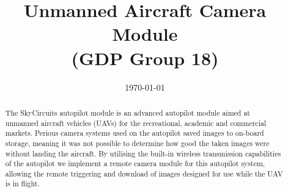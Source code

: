 \documentclass[oneside]{ecsgdp}         %
\begin{document}
\frontmatter
\title      {Unmanned Aircraft Camera Module \\(GDP Group 18)}
\date       {\today}
\subject    {ELEC6050 Group Design Project}
\maketitle
\begin{abstract}
The SkyCircuits autopilot module is an advanced autopilot module aimed at unmanned aircraft vehicles (UAVs) for the recreational, academic and commercial markets. Perious camera systems used on the autopilot saved images to on-board storage, meaning it was not possible to determine how good the taken images were without landing the aircraft. By utilising the built-in wireless transmission capabilities of the autopilot we implement a remote camera module for this autopilot system, allowing the remote triggering and download of images designed for use while the UAV is in flight.

\end{abstract}
\tableofcontents
\listoffigures
\listoftables
\lstlistoflistings
{}
\mainmatter



\newpage

\newpage

\newpage

\newpage

\newpage

\newpage

\newpage

\newpage

\newpage

\newpage

\newpage

\newpage

\newpage

\newpage
\end{document}
